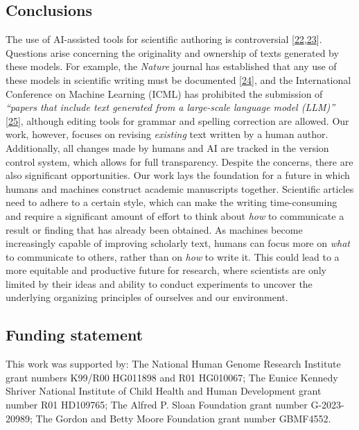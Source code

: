 \documentclass[
]{article}
\begin{document}
\subsection{Conclusions}

The use of AI-assisted tools for scientific authoring is controversial {[}\protect\hyperlink{ref-1EAonKBXJ}{22},\protect\hyperlink{ref-KJTJqmxc}{23}{]}.
Questions arise concerning the originality and ownership of texts generated by these models.
For example, the \emph{Nature} journal has established that any use of these models in scientific writing must be documented {[}\protect\hyperlink{ref-wQLVc4o7}{24}{]}, and the International Conference on Machine Learning (ICML) has prohibited the submission of \emph{``papers that include text generated from a large-scale language model (LLM)''} {[}\protect\hyperlink{ref-K58CKD6D}{25}{]}, although editing tools for grammar and spelling correction are allowed.
Our work, however, focuses on revising \emph{existing} text written by a human author.
Additionally, all changes made by humans and AI are tracked in the version control system, which allows for full transparency.
Despite the concerns, there are also significant opportunities.
Our work lays the foundation for a future in which humans and machines construct academic manuscripts together.
Scientific articles need to adhere to a certain style, which can make the writing time-consuming and require a significant amount of effort to think about \emph{how} to communicate a result or finding that has already been obtained.
As machines become increasingly capable of improving scholarly text, humans can focus more on \emph{what} to communicate to others, rather than on \emph{how} to write it.
This could lead to a more equitable and productive future for research, where scientists are only limited by their ideas and ability to conduct experiments to uncover the underlying organizing principles of ourselves and our environment.

\subsection{Funding statement}

This work was supported by:
The National Human Genome Research Institute grant numbers K99/R00 HG011898 and R01 HG010067;
The Eunice Kennedy Shriver National Institute of Child Health and Human Development grant number R01 HD109765;
The Alfred P. Sloan Foundation grant number G-2023-20989;
The Gordon and Betty Moore Foundation grant number GBMF4552.
\end{document}
